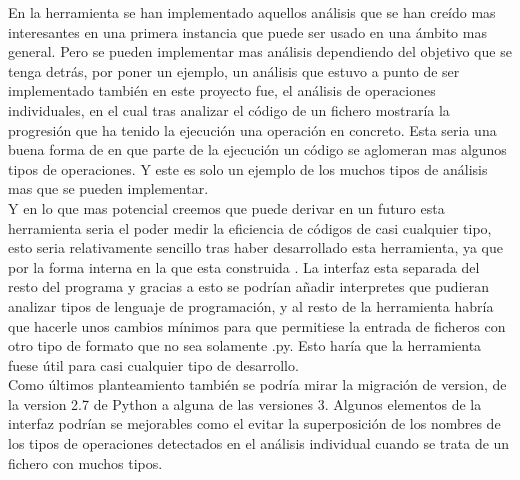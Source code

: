 En la herramienta se han implementado aquellos análisis que se han creído mas interesantes en una primera instancia que puede ser usado en una ámbito mas general. Pero se pueden implementar mas análisis dependiendo del objetivo que se tenga detrás, por poner un ejemplo, un análisis que estuvo a punto de ser implementado también en este proyecto fue, el análisis de operaciones individuales, en el cual tras analizar el código de un fichero mostraría la progresión que ha tenido la ejecución una operación en concreto. Esta seria una buena forma de en que parte de la ejecución un código se aglomeran mas algunos tipos de operaciones. Y este es solo un ejemplo de los muchos tipos de análisis mas que se pueden implementar.\\

Y en lo que mas potencial creemos que puede derivar en un futuro esta herramienta seria el poder medir la eficiencia de códigos de casi cualquier tipo, esto seria relativamente sencillo tras haber desarrollado esta herramienta, ya que por la forma interna en la que esta construida . La interfaz esta separada del resto del programa y gracias a esto se podrían añadir interpretes que pudieran analizar tipos de lenguaje de programación, y al resto de la herramienta habría que hacerle unos cambios mínimos para que permitiese la entrada de ficheros con otro tipo de formato que no sea solamente .py. Esto haría que la herramienta fuese útil para casi cualquier tipo de desarrollo.\\

Como últimos planteamiento también se podría mirar la migración de version, de la version 2.7 de Python a alguna de las versiones 3.
Algunos elementos de la interfaz podrían se mejorables como el evitar la superposición de los nombres de los tipos de operaciones detectados en el análisis individual cuando se trata de un fichero con muchos tipos.

